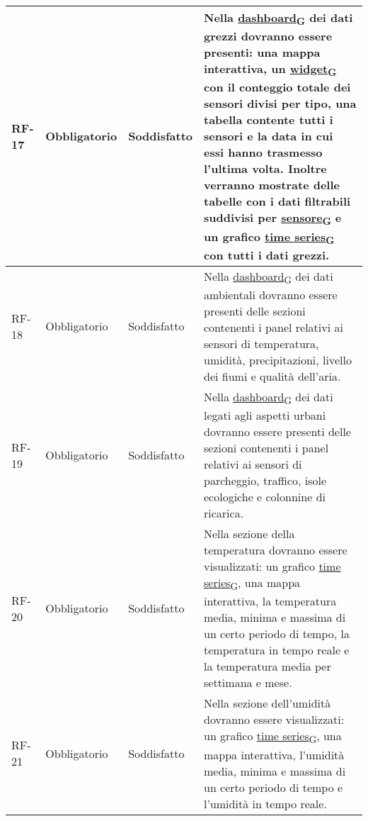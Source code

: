 \begin{longtable}{|>{\centering\arraybackslash}m{}|>{\centering\arraybackslash}m{}|>{\centering\arraybackslash}m{}|>{\centering\arraybackslash}m{}|}
	RF-17           & Obbligatorio        & Soddisfatto                                                                                                           & Nella \href{https://7last.github.io/docs/pb/documentazione-interna/glossario\#dashboard}{dashboard\textsubscript{G}} dei dati grezzi dovranno essere presenti: una mappa interattiva, un \href{https://7last.github.io/docs/pb/documentazione-interna/glossario\#widget}{widget\textsubscript{G}} con il conteggio totale dei sensori divisi per tipo, una tabella contente tutti i sensori e la data in cui essi hanno trasmesso l'ultima volta. Inoltre verranno mostrate delle tabelle con i dati filtrabili suddivisi per \href{https://7last.github.io/docs/pb/documentazione-interna/glossario\#sensore}{sensore\textsubscript{G}} e un grafico \href{https://7last.github.io/docs/pb/documentazione-interna/glossario\#time-series}{time series\textsubscript{G}} con tutti i dati grezzi.
	\\\hline
	RF-18           & Obbligatorio        & Soddisfatto                                                                                                           & Nella \href{https://7last.github.io/docs/pb/documentazione-interna/glossario\#dashboard}{dashboard\textsubscript{G}} dei dati ambientali dovranno essere presenti delle sezioni contenenti i panel relativi ai sensori di temperatura, umidità, precipitazioni, livello dei fiumi e qualità dell'aria.
	\\\hline
	RF-19           & Obbligatorio        & Soddisfatto                                                                                                           & Nella \href{https://7last.github.io/docs/pb/documentazione-interna/glossario\#dashboard}{dashboard\textsubscript{G}} dei dati legati agli aspetti urbani dovranno essere presenti delle sezioni contenenti i panel relativi ai sensori di parcheggio, traffico, isole ecologiche e colonnine di ricarica.
	\\\hline
	RF-20           & Obbligatorio        & Soddisfatto                                                                                                           & Nella sezione della temperatura dovranno essere visualizzati: un grafico \href{https://7last.github.io/docs/pb/documentazione-interna/glossario\#time-series}{time series\textsubscript{G}}, una mappa interattiva, la temperatura media, minima e massima di un certo periodo di tempo, la temperatura in tempo reale e la temperatura media per settimana e mese.
	\\\hline
	RF-21           & Obbligatorio        & Soddisfatto                                                                                                           & Nella sezione dell'umidità dovranno essere visualizzati: un grafico \href{https://7last.github.io/docs/pb/documentazione-interna/glossario\#time-series}{time series\textsubscript{G}}, una mappa interattiva, l'umidità media, minima e massima di un certo periodo di tempo e l'umidità in tempo reale.

\end{longtable}
